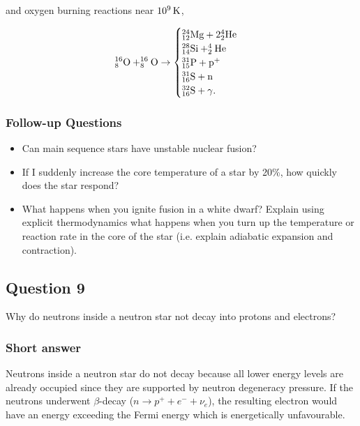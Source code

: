 \documentclass[a4paper,10pt]{article}
\begin{document}
{\noindent}and oxygen burning reactions near $10^9\,{\rm K}$,

\begin{equation*}
^{16}_8{\rm O} + ^{16}_8{\rm O} \rightarrow 
\begin{cases}
    {\rm ^{24}_{12}Mg + 2^4_2He} \\
    {\rm ^{28}_{14}Si + ^4_2He} \\
    {\rm ^{31}_{15}P + p^+} \\
    {\rm ^{31}_{16}S + n} \\
    {\rm ^{32}_{16}S + \gamma}.
\end{cases}
\end{equation*}

\subsubsection{Follow-up Questions}

\begin{itemize}
    \item Can main sequence stars have unstable nuclear fusion?
    \item If I suddenly increase the core temperature of a star by 20\%, how quickly does the star respond?
    \item What happens when you ignite fusion in a white dwarf? Explain using explicit thermodynamics what happens when you turn up the temperature or reaction rate in the core of the star (i.e. explain adiabatic expansion and contraction).
\end{itemize}


\newpage
\subsection{Question 9}

Why do neutrons inside a neutron star not decay into protons and electrons?

\subsubsection{Short answer}

Neutrons inside a neutron star do not decay because all lower energy levels are already occupied since they are supported by neutron degeneracy pressure. If the neutrons underwent $\beta$-decay ($n\rightarrow p^++e^-+\nu_e$), the resulting electron would have an energy exceeding the Fermi energy which is energetically unfavourable.
\end{document}

